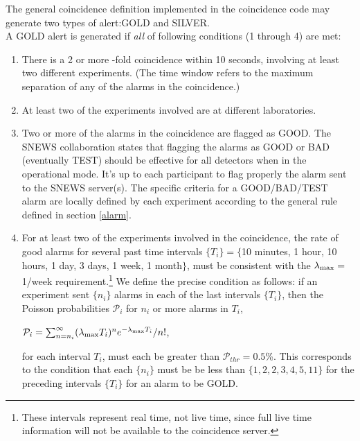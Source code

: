 \documentclass{article}
\begin{document}
The general coincidence definition implemented in the coincidence code
may generate two types of alert:GOLD and SILVER.\\
A GOLD alert is generated if {\it all} of
following conditions (1 through 4) are met:

\begin{enumerate}

\item There is a 2 or more -fold coincidence within 10 seconds,
involving at least two different experiments. 
(The time window refers to the maximum
separation of any of the alarms in the coincidence.)

\item At least two of the experiments involved
are at different laboratories.

\item Two or more of the alarms in the coincidence
are flagged as GOOD.  The SNEWS collaboration states
that flagging the alarms as GOOD or BAD (eventually TEST) should be effective 
for all detectors when in the operational  mode.  
It's up to each participant to flag properly the alarm sent to the SNEWS 
server(s). 
The specific criteria for a GOOD/BAD/TEST alarm are locally defined by
each experiment according to the general rule defined in section \ref{alarm}. 
  
 \item For at least two of the experiments involved in the coincidence,
the rate of good alarms for several past time intervals $\{T_i\}=\{$10 minutes, 1
hour, 10 hours, 1 day, 3 days, 1 week, 1 month$\}$, must be consistent with
the $\lambda_{\rm{max}}=$1/week requirement.\footnote{These intervals
represent real time, not live time, since full live time information
will not be available to the coincidence server.}
We define the precise condition 
as follows:  
if an experiment sent $\{n_i\}$ alarms in 
each of the last intervals $\{T_i\}$,
then the Poisson probabilities $\mathcal{P}_i$ for $n_i$ or more
alarms in $T_i$,

$\mathcal{P}_i=\sum_{n=n_i}^{\infty}(\lambda_{\rm{max}} T_i)^{n}e^{-\lambda_{\rm{max}} T_i}/n!$,

for each interval $T_i$, must each be greater than $\mathcal{P}_{thr}=0.5$\%.
This corresponds to the condition that each $\{n_i\}$ must be be less
than $\{1,2,2,3,4,5,11\}$ for the preceding intervals $\{T_i\}$ for an
alarm to be GOLD.

\end{enumerate}
\end{document}
